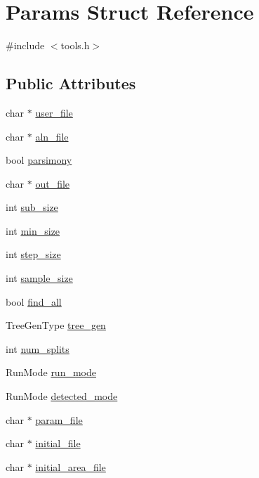 \hypertarget{structParams}{
\section{Params Struct Reference}
\label{structParams}
}


{\ttfamily \#include $<$tools.h$>$}\subsection*{Public Attributes}
\begin{DoxyCompactItemize}
\item 
char $\ast$ \hyperlink{structParams_ab48a8287f2f15edd57f036f11d63c943}{user\_\-file}
\item 
char $\ast$ \hyperlink{structParams_a9d9693f707bda46bd7b29e1c2dcd2d27}{aln\_\-file}
\item 
bool \hyperlink{structParams_a1e66dd646d24a63748e593eba27d17ce}{parsimony}
\item 
char $\ast$ \hyperlink{structParams_a85c096289839853f35830aacc504e054}{out\_\-file}
\item 
int \hyperlink{structParams_a9eb4314daa4b7cf2d08d974c25665d90}{sub\_\-size}
\item 
int \hyperlink{structParams_a3c78c1ab3fab2a470ea7e39a8dd9e4ca}{min\_\-size}
\item 
int \hyperlink{structParams_ac667acebdd5c50499542b4da18d6f60c}{step\_\-size}
\item 
int \hyperlink{structParams_a7da850df5469927efa827d3430774662}{sample\_\-size}
\item 
bool \hyperlink{structParams_ae91712db78b9355a45eb1f1d4301c6c3}{find\_\-all}
\item 
TreeGenType \hyperlink{structParams_af8d9052e0d195e5904e8322889534287}{tree\_\-gen}
\item 
int \hyperlink{structParams_a90484230e2806a900defa3d2f1de0fa5}{num\_\-splits}
\item 
RunMode \hyperlink{structParams_a0ec421aba92e29bf97cc7b0e11480a24}{run\_\-mode}
\item 
RunMode \hyperlink{structParams_ae90dd5c282eca93289af52cda370871b}{detected\_\-mode}
\item 
char $\ast$ \hyperlink{structParams_a24504739447edd1580288dd460179eba}{param\_\-file}
\item 
char $\ast$ \hyperlink{structParams_a709f1c5dcb82385904014373d459f3cf}{initial\_\-file}
\item 
char $\ast$ \hyperlink{structParams_a13862fabd178533e46d5f5e4111d2abc}{initial\_\-area\_\-file}

\end{DoxyCompactItemize}
